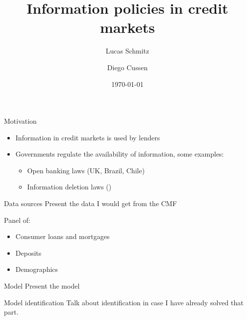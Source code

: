 \documentclass[10pt,aspectratio=169]{beamer}
\title[Sleepy Deposits]{Information policies in credit markets}
\author[Schmitz, Cussen]{Lucas Schmitz\inst{1} \and Diego Cussen\inst{2}}
\institute{\inst{1}Yale Economics \and \inst{2}NYU}
\date{\today}
\begin{document}

\begin{frame}
  \titlepage
\end{frame}



\begin{frame}{Motivation}
\begin{itemize}
	\item Information in credit markets is used by lenders 
	\item Governments regulate the availability of information, some examples: 
	\begin{itemize}
		\item Open banking laws (UK, Brazil, Chile) 
		\item Information deletion laws (\cite{liberman_equilibrium_2018,madeira_impact_2024}) 
	\end{itemize}
\end{itemize}

\end{frame}


\begin{frame}{Data sources}
Present the data I would get from the CMF

Panel of: 
\begin{itemize}
	\item Consumer loans and mortgages 
	\item Deposits
	\item Demographics
\end{itemize}

\end{frame}


\begin{frame}{Model }
Present the model 
\end{frame}

\begin{frame}{Model identification}
Talk about identification in case I have already solved that part. 
\end{frame}
\end{document}
